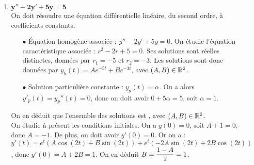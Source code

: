 \documentclass[a4paper, 11pt,reqno]{article}
\begin{document}
\begin{correction}
\begin{enumerate}
          \begin{itemize}
            \item[$\bullet$] \'Equation homog\`ene associ\'ee : $ 4y''-4y'+y= 0$. On \'etudie l'\'equation caract\'eristique associ\'ee : $4r^2 -4r+1=0$. Cette \'equation admet une solution double, donn\'ee par $r=\ddp \frac{1}{2}$. Les solutions sont donc donn\'ees par $y_h(t) = A e^{\frac{t}{2}} + B t e^{\frac{t}{2}}$, avec $(A,B) \in \R^2$.
            \item[$\bullet$] Solution particuli\`ere constante : $y_p(t) = \alpha$. On a alors $y'_p(t) = y_p''(t) = 0$, donc on doit avoir $0 + \alpha = 4$, soit $\alpha = 4$.
          \end{itemize}
          On en d\'eduit que l'ensemble des solutions est , avec $(A,B) \in \R^2\}$.\\
          On \'etudie \`a pr\'esent les conditions initiales. On a $y(0) = 0$, soit $A=0$. De plus, on doit avoir $y'(0)=0$. Or on a : $y'(t) = \ddp \frac{A}{2} e^{\frac{t}{2}}  + B e^{\frac{t}{2}} + \frac{B}{2} t e^{\frac{t}{2}}$, donc $y'(0) = \ddp \frac{A+B}{2} = 1$, soit $B=2$. La solution est donc donn\'ee par  .
    \item $\mathbf{y''-2y'+5y=5}$\\
          On doit r\'esoudre une \'equation diff\'erentielle lin\'eaire, du second ordre, \`a coefficients constants.
          \begin{itemize}
            \item[$\bullet$] \'Equation homog\`ene associ\'ee : $ y''-2y'+5y= 0$. On \'etudie l'\'equation caract\'eristique associ\'ee : $r^2 -2r+5=0$. Ses solutions sont r\'eelles distinctes, donn\'ees par $r_1=-5$ et $r_2=-3$. Les solutions sont donc donn\'ees par $y_h(t) = A e^{-5t} + B e^{-3t}$, avec $(A,B) \in \R^2$.
            \item[$\bullet$] Solution particuli\`ere constante : $y_p(t) = \alpha$. On a alors $y'_p(t) = y_p''(t) = 0$, donc on doit avoir $0 +5 \alpha = 5$, soit $\alpha = 1$.
          \end{itemize}
          On en d\'eduit que l'ensemble des solutions est , avec $(A,B) \in \R^2$.\\
          On \'etudie \`a pr\'esent les conditions initiales. On a $y(0) = 0$, soit $A+1=0$, donc $A=-1$. De plus, on doit avoir $y'(0)=0$. Or on a : $y'(t) = e^{t} (A\cos(2t)+ B \sin(2t)) + e^{t} (-2A\sin(2t)+2B \cos(2t))$, donc $y'(0) = A+2B = 1$. On en d\'eduit $B=\displaystyle \frac{1-A}{2} =1$.

\end{enumerate}
\end{correction}
\end{document}

